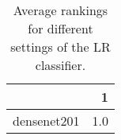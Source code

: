 \begin{table}[H]
\centering
\caption{Average rankings for different settings of the LR classifier.}
\begin{tabular}{lr}
\toprule
{} &    1 \\
\midrule
densenet201 &  1.0 \\
\bottomrule
\end{tabular}
\label{tab:LR}
\end{table}
